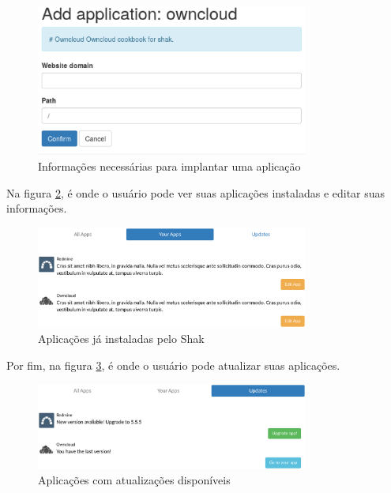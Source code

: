 \begin{figure}[h]
  \centering
  \includegraphics[width=0.8\textwidth]
      {figuras/shakx}
      \caption{Informações necessárias para implantar uma aplicação}
  \label{fig:shakxx}
\end{figure}

Na figura \ref{fig:shakx2}, é onde o usuário pode ver suas aplicações instaladas e editar
suas informações.

\begin{figure}[H]
  \centering
  \includegraphics[width=0.8\textwidth]
      {figuras/shak2}
      \caption{Aplicações já instaladas pelo Shak}
    \label{fig:shakx2}
\end{figure}

Por fim, na figura \ref{fig:shakx3}, é onde o usuário pode atualizar suas aplicações.

\begin{figure}[H]
  \centering
  \includegraphics[width=0.8\textwidth]
      {figuras/shak3}
      \caption{Aplicações com atualizações disponíveis}
  \label{fig:shakx3}
\end{figure}

